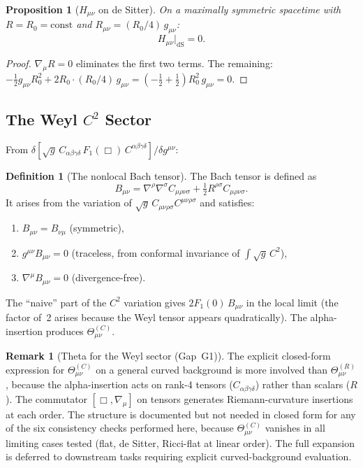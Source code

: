 \documentclass[11pt,a4paper]{article}
\newcommand{\Weylsq}{C_{\mu\nu\rho\sigma}C^{\mu\nu\rho\sigma}}
\theoremstyle{plain}
\newtheorem{proposition}[theorem]{Proposition}
\theoremstyle{definition}
\newtheorem{definition}[theorem]{Definition}
\newtheorem{remark}[theorem]{Remark}
\begin{document}
\begin{proposition}[$H_{\mu\nu}$ on de Sitter]\label{prop:H-dS}
On a maximally symmetric spacetime with $R = R_0 = \mathrm{const}$
and $R_{\mu\nu} = (R_0/4)\,g_{\mu\nu}$:
\begin{equation}
  H_{\mu\nu}\big|_{\mathrm{dS}} = 0.
\end{equation}
\end{proposition}

\begin{proof}
$\nabla_\mu R = 0$ eliminates the first two terms. The remaining:
$-\tfrac{1}{2}g_{\mu\nu}R_0^2 + 2R_0\cdot(R_0/4)\,g_{\mu\nu}
= (-\tfrac{1}{2} + \tfrac{1}{2})R_0^2\,g_{\mu\nu} = 0$.
\end{proof}

\subsection{The Weyl $C^2$ Sector}

From $\delta[\sqrt{g}\,C_{\alpha\beta\gamma\delta}\,
F_1(\Box)\,C^{\alpha\beta\gamma\delta}]/\delta g^{\mu\nu}$:

\begin{definition}[The nonlocal Bach tensor]\label{def:bach}
The Bach tensor is defined as
\begin{equation}\label{eq:bach}
  B_{\mu\nu} = \nabla^\rho\nabla^\sigma C_{\mu\rho\nu\sigma}
  + \tfrac{1}{2}R^{\rho\sigma}C_{\mu\rho\nu\sigma}.
\end{equation}
It arises from the variation of $\sqrt{g}\,\Weylsq$ and satisfies:
\begin{enumerate}[nosep]
  \item $B_{\mu\nu} = B_{\nu\mu}$ (symmetric),
  \item $g^{\mu\nu}B_{\mu\nu} = 0$ (traceless, from conformal
    invariance of $\int\sqrt{g}\,C^2$),
  \item $\nabla^\mu B_{\mu\nu} = 0$ (divergence-free).
\end{enumerate}
\end{definition}

The ``naive'' part of the $C^2$ variation gives $2F_1(0)\,B_{\mu\nu}$ in
the local limit (the factor of~2 arises because the Weyl tensor appears
quadratically). The alpha-insertion produces $\Theta^{(C)}_{\mu\nu}$.

\begin{remark}[Theta for the Weyl sector (Gap~G1)]
The explicit closed-form expression for $\Theta^{(C)}_{\mu\nu}$ on a
general curved background is more involved than $\Theta^{(R)}_{\mu\nu}$,
because the alpha-insertion acts on rank-4 tensors
($C_{\alpha\beta\gamma\delta}$) rather than scalars ($R$). The
commutator $[\Box, \nabla_\mu]$ on tensors generates Riemann-curvature
insertions at each order. The structure is documented but not needed in
closed form for any of the six consistency checks performed here,
because $\Theta^{(C)}_{\mu\nu}$ vanishes in all limiting cases tested
(flat, de Sitter, Ricci-flat at linear order). The full expansion is
deferred to downstream tasks requiring explicit curved-background
evaluation.
\end{remark}
\end{document}

